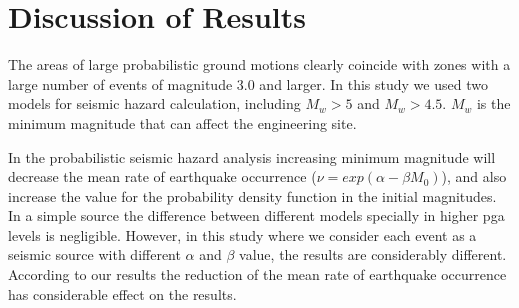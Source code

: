 
\section{Discussion of Results}


The areas of large probabilistic ground motions clearly coincide with zones with a large number of events of magnitude 3.0 and larger. In this study we used two models for seismic hazard calculation, including $M_w>5$ and $M_w>4.5$. $M_w$ is the minimum magnitude that can affect the engineering site. 

In the probabilistic seismic hazard analysis increasing minimum magnitude will decrease the mean rate of earthquake occurrence ($\nu=exp(\alpha - \beta M_0)$), and also increase the value for the probability density function in the initial magnitudes. In a simple source the difference between different models specially in higher pga levels is negligible. However, in this study where we consider each event as a seismic source with different $\alpha$ and $\beta$ value, the results are considerably different. According to our results the reduction of the mean rate of earthquake occurrence has considerable effect on the results. 



